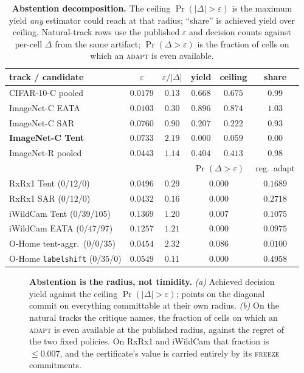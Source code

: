 \begin{table}[t]\centering\scriptsize
\caption{\textbf{Abstention decomposition.} The ceiling $\Pr(|\Delta|>\varepsilon)$ is the maximum
yield \emph{any} estimator could reach at that radius; ``share'' is achieved yield over ceiling.
Natural-track rows use the published $\varepsilon$ and decision counts against per-cell $\Delta$
from the same artifact; $\Pr(\Delta>\varepsilon)$ is the fraction of cells on which an
\textsc{adapt} is even available.}
\label{tab:abstention-decomp}
\setlength{\tabcolsep}{3.2pt}
\begin{tabular}{@{}lccccc@{}}
\toprule
track / candidate & $\varepsilon$ & $\varepsilon/\overline{|\Delta|}$ & yield & ceiling & share \\
\midrule
CIFAR-10-C pooled & $0.0179$ & $0.13$ & $0.668$ & $0.675$ & $\mathbf{0.99}$ \\
ImageNet-C EATA & $0.0103$ & $0.30$ & $0.896$ & $0.874$ & $1.03$ \\
ImageNet-C SAR & $0.0760$ & $0.90$ & $0.207$ & $0.222$ & $0.93$ \\
\textbf{ImageNet-C Tent} & $0.0733$ & $\mathbf{2.19}$ & $\mathbf{0.000}$ & $0.059$ & $\mathbf{0.00}$ \\
ImageNet-R pooled & $0.0443$ & $1.14$ & $0.404$ & $0.413$ & $0.98$ \\
\midrule
& & & \multicolumn{2}{c}{$\Pr(\Delta{>}\varepsilon)$} & reg.\ adapt \\
\midrule
RxRx1 Tent ($0$/$12$/$0$) & $0.0496$ & $0.29$ & \multicolumn{2}{c}{$\mathbf{0.000}$} & $0.1689$ \\
RxRx1 SAR ($0$/$12$/$0$) & $0.0432$ & $0.16$ & \multicolumn{2}{c}{$\mathbf{0.000}$} & $0.2718$ \\
iWildCam Tent ($0$/$39$/$105$) & $0.1369$ & $1.20$ & \multicolumn{2}{c}{$0.007$} & $0.1075$ \\
iWildCam EATA ($0$/$47$/$97$) & $0.1257$ & $1.21$ & \multicolumn{2}{c}{$\mathbf{0.000}$} & $0.0975$ \\
O-Home tent-aggr.\ ($0$/$0$/$35$) & $0.0454$ & $2.32$ & \multicolumn{2}{c}{$0.086$} & $0.0100$ \\
O-Home \texttt{labelshift} ($0$/$35$/$0$) & $0.0549$ & $0.11$ & \multicolumn{2}{c}{$0.000$} & $\mathbf{0.4958}$ \\
\bottomrule
\end{tabular}
\end{table}

\begin{figure}[t]\centering
{}
\caption{\textbf{Abstention is the radius, not timidity.} \emph{(a)} Achieved decision yield against
the ceiling $\Pr(|\Delta|>\varepsilon)$; points on the diagonal commit on everything committable at
their own radius. \emph{(b)} On the natural tracks the critique names, the fraction of cells on
which an \textsc{adapt} is even available at the published radius, against the regret of the two
fixed policies. On RxRx1 and iWildCam that fraction is $\le0.007$, and the certificate's value is
carried entirely by its \textsc{freeze} commitments.}
\label{fig:yield-ceiling}
\end{figure}

